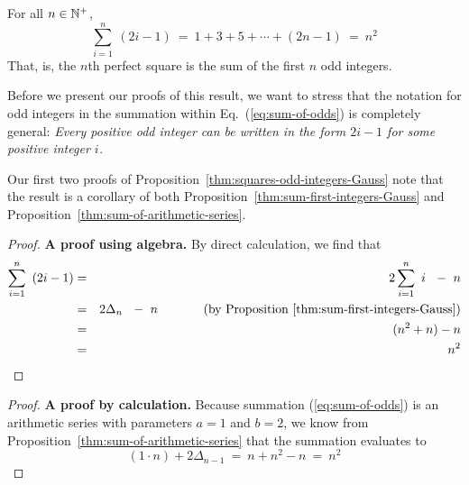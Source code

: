 \begin{prop}
\label{thm:squares-odd-integers-Gauss}
For all $n \in \mathbb{N}^+$,
\begin{equation}
\label{eq:sum-of-odds}
\sum_{i=1}^n \ (2i-1)
 \ = \ 1 + 3 + 5 + \cdots + (2n-1) \ = \ n^2
\end{equation}
That, is, the $n$th perfect square is the sum of the first $n$ odd integers.
\end{prop}

Before we present our proofs of this result, we want to stress that the notation for odd integers in the summation within Eq.~(\ref{eq:sum-of-odds}) is completely general: {\em Every positive odd integer can be written in the form $2i-1$ for some positive integer $i$.}

\bigskip

Our first two proofs of Proposition~\ref{thm:squares-odd-integers-Gauss} note that the result is a corollary of both Proposition~\ref{thm:sum-first-integers-Gauss} and Proposition~\ref{thm:sum-of-arithmetic-series}.

\medskip

\begin{proof}
{\bf A proof using algebra.}
By direct calculation, we find that
\begin{eqnarray*}
\sum_{i=1}^n \ \left( 2i-1 \right)
   & = & 2 \sum_{i=1}^n \ i \ \ - \ n \\
   & = & 2 \Delta_n \ \ - \ n \ \ \ \ \ \ \ \ \ \ \mbox{ (by
  Proposition~\ref{thm:sum-first-integers-Gauss})} \\
   & = & (n^2 + n) - n \\
   & = & n^2
\end{eqnarray*}
\end{proof}

\medskip

\begin{proof}
{\bf A proof by calculation.}
%
Because summation (\ref{eq:sum-of-odds}) is an arithmetic series with parameters $a=1$ and $b=2$, we know from Proposition~\ref{thm:sum-of-arithmetic-series} that the summation evaluates to
\[ (1 \cdot n) + 2 \Delta_{n-1} \ = \ n + n^2 -n \ = \ n^2 \]
\end{proof}



